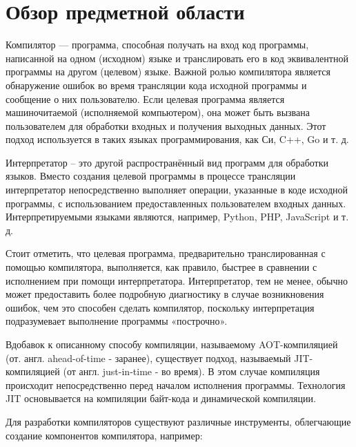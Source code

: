 \newpage
\section{Обзор предметной области}

Компилятор --- программа, способная получать на вход код программы, написанной на одном (исходном) языке и транслировать его в код эквивалентной программы на другом (целевом) языке.
Важной ролью компилятора является обнаружение ошибок во время трансляции кода исходной программы и сообщение о них пользователю.
Если целевая программа является машиночитаемой (исполняемой компьютером), она может быть вызвана пользователем для обработки входных и получения выходных данных.
Этот подход используется в таких языках программирования, как Си, C++, Go и т. д.

Интерпретатор -- это другой распространённый вид программ для обработки языков.
Вместо создания целевой программы в процессе трансляции интерпретатор непосредственно выполняет операции, указанные в коде исходной программы, с использованием предоставленных пользователем входных данных.
Интерпретируемыми языками являются, например, Python, PHP, JavaScript и т. д.

Стоит отметить, что целевая программа, предварительно транслированная с помощью компилятора, выполняется, как правило, быстрее в сравнении с исполнением при помощи интерпретатора.
Интерпретатор, тем не менее, обычно может предоставить более подробную диагностику в случае возникновения ошибок, чем это способен сделать компилятор, поскольку интерпретация подразумевает выполнение программы «построчно».

Вдобавок к описанному способу компиляции, называемому AOT-компиляцией (от. англ. ahead-of-time - заранее), существует подход, называемый JIT-компиляцией (от англ. just-in-time - во время).
В этом случае компиляция происходит непосредственно перед началом исполнения программы.
Технология JIT основывается на компиляции байт-кода и динамической компиляции.

Для разработки компиляторов существуют различные инструменты, облегчающие создание компонентов компилятора, например:

